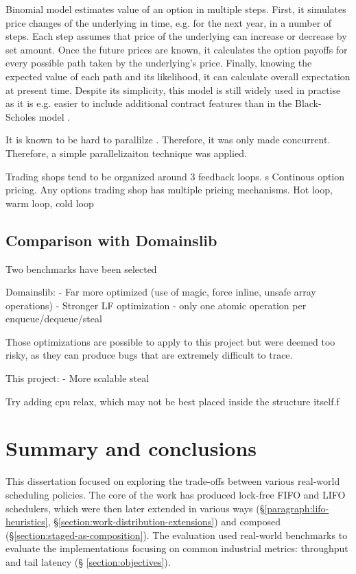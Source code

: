 \documentclass[12pt,a4paper,twoside]{report}
\begin{document}
Binomial model estimates value of an option in multiple steps. First, it simulates price changes of the underlying in time, e.g. for the next year, in a number of steps. Each step assumes that price of the underlying can increase or decrease by set amount. Once the future prices are known, it calculates the option payoffs for every possible path taken by the underlying's price. Finally, knowing the expected value of each path and its likelihood, it can calculate overall expectation at present time. Despite its simplicity, this model is still widely used in practise as it is e.g. easier to include additional contract features than in the Black-Scholes model . 


It is known to be hard to parallilze . Therefore, it was only made concurrent. Therefore, a simple parallelizaiton technique was applied. 

Trading shops tend to be organized around 3 feedback loops. s
Continous option pricing. 
Any options trading shop has multiple pricing mechanisms. Hot loop, warm loop, cold loop

\section{Comparison with Domainslib}
\label{section:result_with_domainslib}
Two benchmarks have been selected 


Domainslib:
- Far more optimized (use of magic, force inline, unsafe array operations)
- Stronger LF optimization - only one atomic operation per enqueue/dequeue/steal 

Those optimizations are possible to apply to this project but were deemed too risky, as they can produce bugs that are extremely difficult to trace. 

This project: 
- More scalable steal 

Try adding cpu relax, which may not be best placed inside the structure itself.f


\chapter{Summary and conclusions}


This dissertation focused on exploring the trade-offs between various real-world scheduling policies. The core of the work has produced lock-free FIFO and LIFO schedulers, which were then later extended in various ways (\S\ref{paragraph:lifo-heuristics}, \S\ref{section:work-distribution-extensions}) and composed (\S\ref{section:staged-as-composition}). The evaluation used real-world benchmarks to evaluate the implementations focusing on common industrial metrics: throughput and tail latency (\S
\ref{section:objectives}). 
\end{document}
